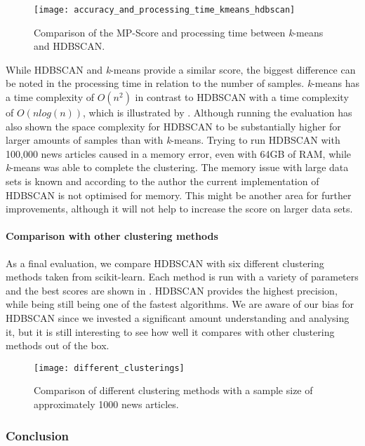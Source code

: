 \begin{figure}[h]
    \centering
    \texttt{[image: accuracy\_and\_processing\_time\_kmeans\_hdbscan]}
    \caption{Comparison of the MP-Score and processing time between \textit{k}-means and HDBSCAN.}
    \label{fig:precision_and_processing_time_kmeans_hdbscan}
\end{figure}

While HDBSCAN and \textit{k}-means provide a similar score,
the biggest difference can be noted in the processing time in relation to the number of samples.
\textit{k}-means has a time complexity of $O(n^2)$ in contrast to HDBSCAN with a time complexity of $O(nlog(n))$,
which is illustrated by .
Although running the evaluation has also shown the space complexity for HDBSCAN
to be substantially higher for larger amounts of samples than with \textit{k}-means.
Trying to run HDBSCAN with 100,000 news articles caused in a memory error,
even with 64GB of RAM, while \textit{k}-means was able to complete the clustering.
The memory issue with large data sets is known and according to the author the current implementation of HDBSCAN
is not optimised for memory\cite{hdbscan_memory_issue}.
This might be another area for further improvements,
although it will not help to increase the score on larger data sets.

\paragraph{Comparison with other clustering methods}
As a final evaluation, we compare HDBSCAN with six different clustering methods taken from scikit-learn.
Each method is run with a variety of parameters and the best scores are shown in .
HDBSCAN provides the highest precision, while being still being one of the fastest algorithms.
We are aware of our bias for HDBSCAN since we invested a significant amount understanding and analysing it,
but it is still interesting to see how well it compares with other clustering methods out of the box.

\begin{figure}[h]
    \centering
    \texttt{[image: different\_clusterings]}
    \caption{Comparison of different clustering methods with a sample size of approximately 1000 news articles.}
    \label{fig:different_clusterings}
\end{figure}

\subsubsection{Conclusion}
\label{subsubsec:5a_conclusion}

